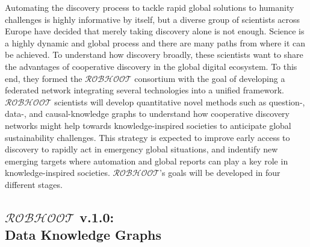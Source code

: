 \documentclass[12pt, a4paper]{article} %
\begin{document}

    
    Automating the discovery process to tackle rapid global solutions
    to humanity challenges is highly informative by itself, but a
    diverse group of scientists across Europe have decided that merely
    taking discovery alone is not enough. Science is a highly dynamic
    and global process and there are many paths from where it can be
    achieved. To understand how discovery broadly, these scientists
    want to share the advantages of cooperative discovery in the
    global digital ecosystem. To this end, they formed the
    $\mathcal{ROBHOOT}$ consortium with the goal of developing a
    federated network integrating several technologies into a unified
    framework. $\mathcal{ROBHOOT}$ scientists will develop
    quantitative novel methods such as question-, data-, and
    causal-knowledge graphs to understand how cooperative discovery
    networks might help towards knowledge-inspired societies to
    anticipate global sustainability challenges. This strategy is
    expected to improve early access to discovery to rapidly act in
    emergency global situations, and indentify new emerging targets
    where automation and global reports can play a key role in
    knowledge-inspired societies. $\mathcal{ROBHOOT}$'s goals will be
    developed in four different stages.

      \subsection{{\bf $\mathcal{ROBHOOT}$ v.1.0}: \\ Data Knowledge Graphs}
\end{document}
